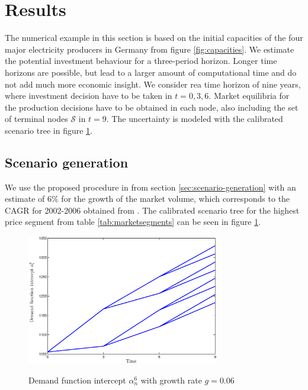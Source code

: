 \clearpage
\section{Results}
\label{sec:results}

The numerical example in this section is based on the initial capacities of the four major electricity producers in Germany from figure \ref{fig:capacities}. We estimate the potential investment behaviour for a three-period horizon. Longer time horizons are possible, but lead to a larger amount of computational time and do not add much more economic insight. We consider rea time horizon of nine years, where investment decision have to be taken in $t=0,3,6$. Market equilibria for the production decisions have to be obtained in each node, also including the set of terminal nodes $\mathcal{S}$ in $t=9$.  The uncertainty is modeled with the calibrated scenario tree in figure \ref{fig:intercept}.

\subsection{Scenario generation}

We use the proposed procedure in from section \ref{sec:scenario-generation} with an estimate of $6\%$ for the growth of the market volume, which corresponds to the CAGR for 2002-2006 obtained from \cite{Datamonitor2007}. The calibrated scenario tree for the highest price segment from table \ref{tab:marketsegments} can be seen in figure \ref{fig:intercept}.

\begin{figure}[htb]
  \centering
\caption{Demand function intercept $\alpha_n^6$ with growth rate $g=0.06$}
  \includegraphics[width=0.75\textwidth]{numericalpaper/intercept}
  \label{fig:intercept}
\end{figure}

